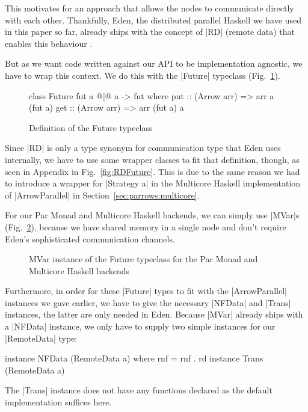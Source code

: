 This motivates for an approach that allows the nodes to communicate directly with each other. Thankfully, Eden, the distributed parallel Haskell we have used in this paper so far, already ships with the concept of |RD| (remote data) that enables this behaviour \cite{AlGo03a,Dieterle2010}.

But as we want code written against our API to be implementation agnostic, we have to wrap this context. We do this with the |Future| typeclass (Fig.~\ref{fig:future}).
\begin{figure}[h]
\begin{code}
class Future fut a @|@ a -> fut where
    put :: (Arrow arr) => arr a (fut a)
    get :: (Arrow arr) => arr (fut a) a
\end{code}
\caption{Definition of the Future typeclass}
\label{fig:future}
\end{figure}
Since |RD| is only a type synonym for communication type that Eden uses internally, we have to use some wrapper classes to fit that definition, though, as seen in Appendix in Fig.~\ref{fig:RDFuture}. This is due to the same reason we had to introduce a wrapper for |Strategy a| in the Multicore Haskell implementation of |ArrowParallel| in Section~\ref{sec:parrows:multicore}.

For our Par Monad and Multicore Haskell backends, we can simply use |MVar|s \cite{jones1996concurrent} (Fig.~\ref{fig:MVarFuture}), because we have shared memory in a single node and don't require Eden's sophisticated communication channels. 
\begin{figure}[h]
\caption{MVar instance of the Future typeclass for the Par Monad and Multicore Haskell backends}
\label{fig:MVarFuture}
\end{figure} %

Furthermore, in order for these |Future| types to fit with the |ArrowParallel| instances we gave earlier, we have to give the necessary |NFData| and |Trans| instances, the latter are only needed in Eden. Because |MVar| already ships with a |NFData| instance, we only have to supply two simple instances for our |RemoteData| type:
\begin{code}
instance NFData (RemoteData a) where
    rnf = rnf . rd
instance Trans (RemoteData a)
\end{code}
The |Trans| instance does not have any functions declared as the default implementation suffices here.

